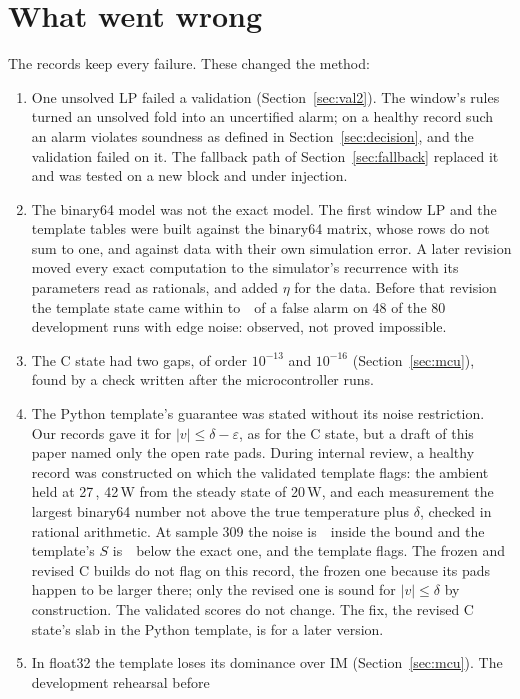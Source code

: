 \section{What went wrong}\label{sec:wrong}

The records keep every failure. These changed the method:
\begin{enumerate}
\item One unsolved LP failed a validation (Section~\ref{sec:val2}). The window's rules turned an unsolved fold into an
  uncertified alarm; on a healthy record such an alarm violates soundness as defined in Section~\ref{sec:decision},
  and the validation failed on it. The fallback path of Section~\ref{sec:fallback} replaced it and
  was tested on a new block and under injection.
\item The binary64 model was not the exact model. The first window LP and the template tables were built against the
  binary64 matrix, whose rows do not sum to one, and against data with their own simulation error. A later revision
  moved every exact computation to the simulator's recurrence with its parameters read as rationals, and added $\eta$
  for the data. Before that revision the template state came within  to \,\degC\ of a
  false alarm on 48 of the 80 development runs with edge noise: observed, not proved impossible.
\item The C state had two gaps, of order $10^{-13}$ and $10^{-16}$ (Section~\ref{sec:mcu}), found by a check written
  after the microcontroller runs.
\item The Python template's guarantee was stated without its noise restriction. Our records gave it for
  $|v|\le\delta-\varepsilon$, as for the C state, but a draft of this paper named only the open rate pads. During
  internal review, a healthy record was constructed on which the validated template flags: the ambient held at 27\,\degC, 42\,W
  from the steady state of 20\,W, and each measurement the largest binary64 number not above the true temperature plus
  $\delta$, checked in rational arithmetic. At sample 309 the noise is \,\degC\ inside the bound and the
  template's $S$ is \,\degC\ below the exact one, and the template flags. The frozen and revised C builds
  do not flag on this record, the frozen one because its pads happen to be larger there; only the revised one is
  sound for $|v|\le\delta$ by construction. The validated scores
  do not change. The fix, the revised C state's slab in the Python template, is for a later version.
\item In float32 the template loses its dominance over IM (Section~\ref{sec:mcu}). The development rehearsal before

\end{enumerate}
